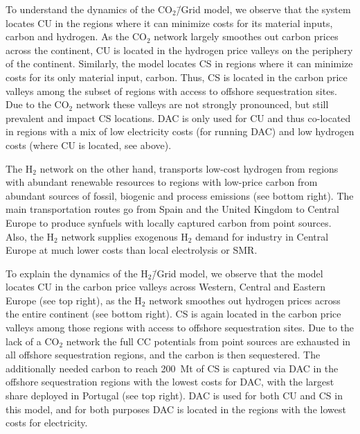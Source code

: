 \documentclass[twocolumn]{article}
\newcommand{\COtwo}{CO$_2$}
\newcommand{\Htwo}{H$_2$}
\newcommand{\modCO}{CO$_2$\=/Grid model}
\newcommand{\modH}{H$_2$\=/Grid model}
\begin{document}
To understand the dynamics of the \modCO{}, we observe that the system locates CU in the regions where it can minimize costs for its material inputs, carbon and hydrogen. As the \COtwo{} network largely smoothes out carbon prices across the continent, CU is located in the hydrogen price valleys on the periphery of the continent. Similarly, the model locates CS in regions where it can minimize costs for its only material input, carbon. Thus, CS is located in the carbon price valleys among the subset of regions with access to offshore sequestration sites. Due to the \COtwo{} network these valleys are not strongly pronounced, but still prevalent and impact CS locations. DAC is only used for CU and thus co-located in regions with a mix of low electricity costs (for running DAC) and low hydrogen costs (where CU is located, see above).

The \Htwo{} network on the other hand, transports low-cost hydrogen from regions with abundant renewable resources to regions with low-price carbon from abundant sources of fossil, biogenic and process emissions (see bottom right). The main transportation routes go from Spain and the United Kingdom to Central Europe to produce synfuels with locally captured carbon from point sources. Also, the \Htwo{} network supplies exogenous \Htwo{} demand for industry in Central Europe at much lower costs than local electrolysis or SMR.

To explain the dynamics of the \modH{}, we observe that the model locates CU in the carbon price valleys across Western, Central and Eastern Europe (see top right), as the \Htwo{} network smoothes out hydrogen prices across the entire continent (see bottom right). CS is again located in the carbon price valleys among those regions with access to offshore sequestration sites. Due to the lack of a \COtwo{} network the full CC potentials from point sources are exhausted in all offshore sequestration regions, and the carbon is then sequestered. The additionally needed carbon to reach 200~Mt of CS is captured via DAC in the offshore sequestration regions with the lowest costs for DAC, with the largest share deployed in Portugal (see top right). DAC is used for both CU and CS in this model, and for both purposes DAC is located in the regions with the lowest costs for electricity.
\end{document}

